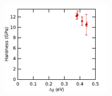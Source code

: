 \begin{figure}
\centering
\includegraphics[width=0.5\textwidth]{dX_vs_hardness_Ti2Ni}
\end{figure}
























